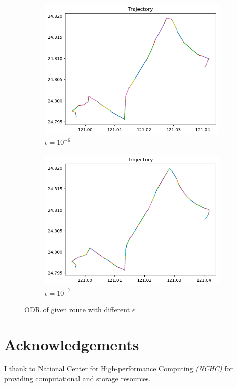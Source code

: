 \documentclass[12pt, a4paper]{article}
\begin{document}
\begin{figure}[h]
\begin{subfigure}{.45\linewidth}
\includegraphics[width=\linewidth]{q5_c}
\caption{$\epsilon=10^{-6}$}
\end{subfigure}
\begin{subfigure}{.45\linewidth}
\includegraphics[width=\linewidth]{q5_d}
\caption{$\epsilon=10^{-7}$}
\end{subfigure}
\caption{ODR of given route with different $\epsilon$}
\label{fig:q5}
\end{figure}

\pagebreak[4]

\section*{Acknowledgements}

I thank to \textsf{National Center for High-performance Computing} \textit{(NCHC)} for providing computational and storage resources.
\end{document}
